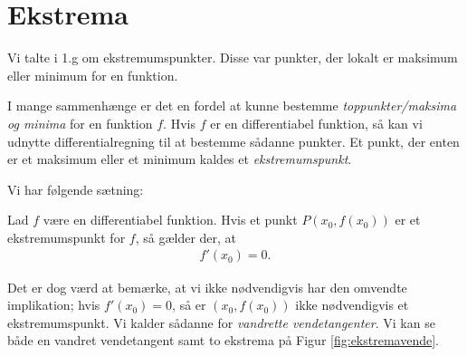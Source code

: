 \section*{Ekstrema}

Vi talte i 1.g om ekstremumspunkter. Disse var punkter, der lokalt er maksimum eller minimum for en funktion. 

I mange sammenhænge er det en fordel at kunne bestemme \textit{toppunkter/maksima og minima} for en funktion $f$. Hvis $f$ er en differentiabel funktion, så kan vi udnytte differentialregning til at bestemme sådanne punkter. Et punkt, der enten er et maksimum eller et minimum kaldes et \textit{ekstremumspunkt}. 

Vi har følgende sætning:
\begin{setn}[Ekstremumspunkter]
	Lad $f$ være en differentiabel funktion. Hvis et punkt $P(x_0,f(x_0))$ er et ekstremumspunkt for $f$, så gælder der, at 
	\begin{align*}
		f'(x_0) = 0.
	\end{align*}
\end{setn}
Det er dog værd at bemærke, at vi ikke nødvendigvis har den omvendte implikation; hvis $f'(x_0)=0$, så er $(x_0,f(x_0))$ ikke nødvendigvis et ekstremumspunkt. Vi kalder sådanne for \textit{vandrette vendetangenter}. Vi kan se både en vandret vendetangent samt to ekstrema på Figur \ref{fig:ekstremavende}.


